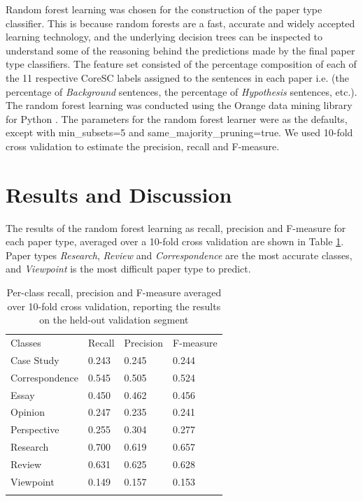 \documentclass{svmult}
\begin{document}

Random forest learning\cite{Breiman2001} was chosen for the construction of the
paper type classifier. This is because random forests are a fast, accurate and
widely accepted learning technology, and the underlying decision trees can be
inspected to understand some of the reasoning behind the predictions made by
the final paper type classifiers. The feature set consisted of the percentage
composition of each of the 11 respective CoreSC labels assigned to the
sentences in each paper i.e. (the percentage of {\em Background} sentences, the
percentage of {\em Hypothesis} sentences, etc.). The random forest learning was
conducted using the Orange data mining library for Python \cite{Curk2005}.  The
parameters for the random forest learner were as the defaults, except with
min\_subsets=5 and same\_majority\_pruning=true.  We used 10-fold cross
validation to estimate the precision, recall and F-measure.


\section{Results and Discussion}
\label{sec:3}

The results of the random forest learning as recall, precision and F-measure
for each paper type, averaged over a 10-fold cross validation are shown in Table
\ref{tab:recallPrecision}. Paper types {\em Research}, {\em Review} and {\em
Correspondence} are the most accurate classes, and {\em Viewpoint} is the most
difficult paper type to predict. 

\begin{table}
\caption{Per-class recall, precision and F-measure averaged over 10-fold cross validation, reporting the results on the held-out validation segment}
\label{tab:recallPrecision}       %
\begin{tabular}{p{2cm}p{2.4cm}p{2cm}p{4.9cm}}
\hline\noalign{\smallskip}
Classes & Recall & Precision & F-measure  \\
\noalign{\smallskip}\svhline\noalign{\smallskip}
Case Study   &     0.243    &    0.245     &   0.244 \\
Correspondence  &      0.545    &    0.505    &    0.524 \\ 
Essay     &   0.450     &   0.462    &    0.456 \\
Opinion   &     0.247    &    0.235  &      0.241 \\   
Perspective &       0.255  &      0.304  &       0.277 \\
Research     &   0.700    &    0.619    &    0.657 \\
Review      &  0.631     &   0.625     &   0.628 \\
Viewpoint   &     0.149     &   0.157  &      0.153 \\
\noalign{\smallskip}\hline\noalign{\smallskip}
\end{tabular}
\end{table}
\end{document}
